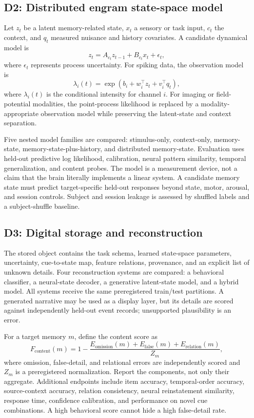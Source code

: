 \documentclass[conference]{IEEEtran}
\begin{document}
\subsection{D2: Distributed engram state-space model}
Let $z_t$ be a latent memory-related state, $x_t$ a sensory or task input, $c_t$ the context, and $q_t$ measured nuisance and history covariates. A candidate dynamical model is
\begin{equation}
z_t=A_{c_t}z_{t-1}+B_{c_t}x_t+\epsilon_t,
\label{eq:state}
\end{equation}
where $\epsilon_t$ represents process uncertainty. For spiking data, the observation model is
\begin{equation}
\lambda_i(t)=\exp\left(b_i+w_i^\top z_t+v_i^\top q_t\right),
\label{eq:observation}
\end{equation}
where $\lambda_i(t)$ is the conditional intensity for channel $i$. For imaging or field-potential modalities, the point-process likelihood is replaced by a modality-appropriate observation model while preserving the latent-state and context separation.

Five nested model families are compared: stimulus-only, context-only, memory-state, memory-state-plus-history, and distributed memory-state. Evaluation uses held-out predictive log likelihood, calibration, neural pattern similarity, temporal generalization, and content probes. The model is a measurement device, not a claim that the brain literally implements a linear system. A candidate memory state must predict target-specific held-out responses beyond state, motor, arousal, and session controls. Subject and session leakage is assessed by shuffled labels and a subject-shuffle baseline.

\subsection{D3: Digital storage and reconstruction}
The stored object contains the task schema, learned state-space parameters, uncertainty, cue-to-state map, feature relations, provenance, and an explicit list of unknown details. Four reconstruction systems are compared: a behavioral classifier, a neural-state decoder, a generative latent-state model, and a hybrid model. All systems receive the same preregistered train/test partitions. A generated narrative may be used as a display layer, but its details are scored against independently held-out event records; unsupported plausibility is an error.

For a target memory $m$, define the content score as
\begin{equation}
F_{\mathrm{content}}(m)=1-\frac{E_{\mathrm{omission}}(m)+E_{\mathrm{false}}(m)+E_{\mathrm{relation}}(m)}{Z_m},
\label{eq:content}
\end{equation}
where omission, false-detail, and relational errors are independently scored and $Z_m$ is a preregistered normalization. Report the components, not only their aggregate. Additional endpoints include item accuracy, temporal-order accuracy, source-context accuracy, relation consistency, neural reinstatement similarity, response time, confidence calibration, and performance on novel cue combinations. A high behavioral score cannot hide a high false-detail rate.
\end{document}
